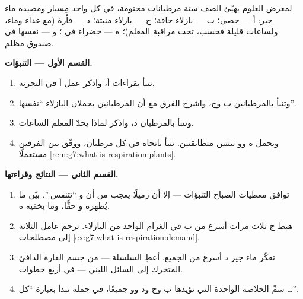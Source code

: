 \begin{problem}\label{pb:g7:what-is-respiration:1}
لمعرض العلوم يهيّئ الصف ستة مرطبانات مختومة، في كل واحد مِسبار
 ومصيدة ماء جير: أ --- حصى؛ ب --- بازلاء جافة؛ ج --- بازلاء
منبتة؛ د --- فأرة (مع غذاء وماء، ولساعات قليلة فحسب، تحت مراقبة
المعلم)؛ ه ---  خضراء في ؛ و ---  نفسها في صندوق
مظلم.

\medskip\noindent\textbf{القسم الأول --- التنبؤات.}
\begin{enumerate}
  \item تنبأ بقراءات أ، واذكر عمل أ في التجربة.
  \item وتنبأ بالمرطبانين ب وج، واشرح الفرق مع أن المرطبانين يحملان
        البازلاء ``نفسها''.
  \item وتنبأ بالمرطبان د، واذكر لماذا يحدّ المعلم الساعات.
  \item ويحمل ه وو نبتتين متطابقتين. تنبأ باتجاه  في كل
        مرطبان، ووفّق بين الفرقين مستعملًا
        \cref{rem:g7:what-is-respiration:plants}.
\end{enumerate}

\medskip\noindent\textbf{القسم الثاني --- النتائج وقراءتها.}
\begin{enumerate}[resume]
  \item توافق معطيات الصباح التنبؤات --- إلا أن زميلًا يعجب من أن
         و ``تتنفس ''. بيّن ما يُظهره و حقًّا، وما
        يخفيه ه.
  \item هبط  ج ثلاث مرات أسرع من  ب في الغرام الواحد
        من البازلاء. ترجم عامل الثلاثة إلى مصطلحات
        \cref{ex:g7:what-is-respiration:demand}.
  \item تعكّر ماء جير د أسرع من الجميع. أعطِ السلسلة --- من جسم
        الفأرة الدافئ المتحرك إلى السائل اللبني --- في أربع
        خطوات.
  \item سمِّ الخلاصة الواحدة التي تؤيدها ب وج ود وو جميعًا، في
        جملة تبدأ بعبارة ``كل \dots''.
\end{enumerate}


\end{problem}
